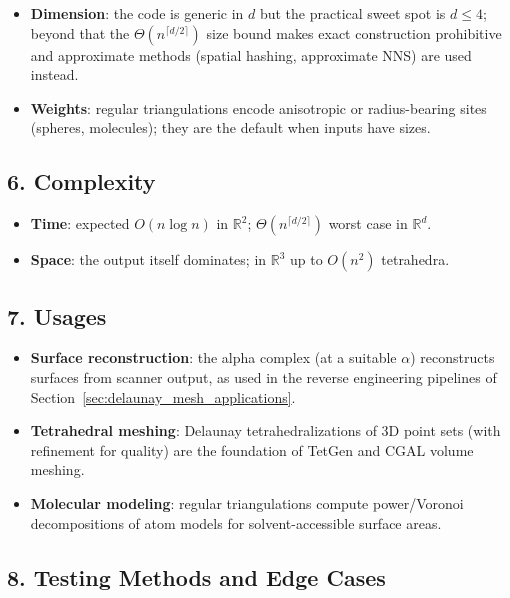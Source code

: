 \begin{itemize}
\item \textbf{Dimension}: the code is generic in $d$ but the practical
  sweet spot is $d \le 4$; beyond that the $\Theta(n^{\lceil d/2\rceil})$ size
  bound makes exact construction prohibitive and approximate methods (spatial
  hashing, approximate NNS) are used instead.
\item \textbf{Weights}: regular triangulations encode anisotropic or
  radius-bearing sites (spheres, molecules); they are the default when inputs
  have sizes.
\end{itemize}

\subsection{6. Complexity}

\begin{itemize}
\item \textbf{Time}: expected $O(n \log n)$ in $\mathbb{R}^2$;
  $\Theta(n^{\lceil d/2\rceil})$ worst case in $\mathbb{R}^d$.
\item \textbf{Space}: the output itself dominates; in $\mathbb{R}^3$ up to
  $O(n^2)$ tetrahedra.
\end{itemize}

\subsection{7. Usages}

\begin{itemize}
\item \textbf{Surface reconstruction}: the alpha complex (at a suitable
  $\alpha$) reconstructs surfaces from scanner output, as used in the reverse
  engineering pipelines of Section~\ref{sec:delaunay_mesh_applications}.
\item \textbf{Tetrahedral meshing}: Delaunay tetrahedralizations of 3D point
  sets (with refinement for quality) are the foundation of TetGen and CGAL
  volume meshing.
\item \textbf{Molecular modeling}: regular triangulations compute
  power/Voronoi decompositions of atom models for solvent-accessible surface
  areas.
\end{itemize}

\subsection{8. Testing Methods and Edge Cases}

